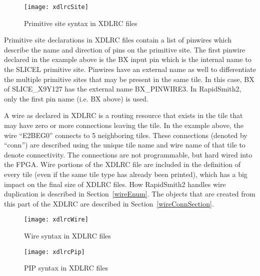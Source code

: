\begin{figure}[H]
	\centering
	\texttt{[image: xdlrcSite]}
	\caption{Primitive site syntax in XDLRC files}
	\label{fig:xdlrcSite}
\end{figure}

\noindent
Primitive site declarations in XDLRC files contain a list of pinwires which
describe the name and direction of pins on the primitive site. The first
pinwire declared in the example above is the BX input pin which is the internal
name to the SLICEL primitive site. Pinwires have an external name as well to
differentiate the multiple primitive sites that may be present in the same
tile. In this case, BX of SLICE\_X9Y127 has the external name BX\_PINWIRE3. In
RapidSmith2, only the first pin name (i.e. BX above) is used.

\bigbreak \noindent
\begin{large}
\end{large}

\noindent
A wire as declared in XDLRC is a routing resource that exists in the tile that
may have zero or more connections leaving the tile. In the example above, the
wire ``E2BEG0'' connects to 5 neighboring tiles. These connections (denoted
by ``conn'') are described using the unique tile name and wire name of that tile
to denote connectivity. The connections are not programmable, but hard wired
into the FPGA. Wire portions of the XDLRC file are included in the definition of
every tile (even if the same tile type has already been printed), which has a
big impact on the final size of XDLRC files. How RapidSmith2 handles wire
duplication is described in Section~\ref{wireEnum}. The 
objects that are created from this part of the XDLRC are described in
Section~\ref{wireConnSection}.

\begin{figure}[t]
	\centering
	\texttt{[image: xdlrcWire]}
	\caption{Wire syntax in XDLRC files}
	\label{fig:xdlrcWire}
\end{figure}


\bigbreak \noindent
\begin{large}
\end{large}

\begin{figure}[H]
	\centering
	\texttt{[image: xdlrcPip]}
	\caption{PIP syntax in XDLRC files}
	\label{fig:xdlrcPip}
\end{figure}

